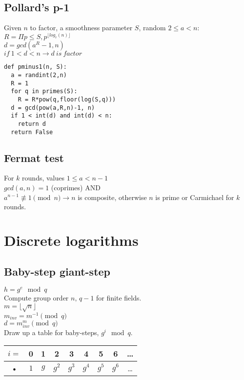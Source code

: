 \documentclass{article}
\begin{document}
\subsection{Pollard's p-1}
Given $n$ to factor, a smoothness parameter $S$, random $2 \leq a < n$: \\
$R = \Pi p \leq S, p^{\lfloor log_r(n) \rfloor}$ \\
$d = gcd(a^R-1, n)$ \\
$if~1 < d < n \rightarrow d~is~factor$ \\

\begin{verbatim}
def pminus1(n, S):
  a = randint(2,n)
  R = 1
  for q in primes(S):
    R = R*pow(q,floor(log(S,q)))
  d = gcd(pow(a,R,n)-1, n)
  if 1 < int(d) and int(d) < n:
    return d
  return False
\end{verbatim}

\subsection{Fermat test}
For $k$ rounds, values $1 \leq a < n-1$ \\
$gcd(a,n) = 1$ (coprimes) AND \\
$a^{n-1} \not\equiv 1 \pmod n \rightarrow n$ is composite,
otherwise $n$ is prime or Carmichael for $k$ rounds. \\

\section{Discrete logarithms}
\subsection{Baby-step giant-step}
$h = g^e \mod q$ \\
Compute group order $n$, $q-1$ for finite fields. \\
$m = \lfloor \sqrt{n} \rfloor$\\
$m_{inv} = m^{-1} \pmod{q}$\\
$d = m_{inv}^{m} \pmod{q}$\\

Draw up a table for baby-steps, $g^i \mod q$.\\
\begin{tabular}{|c|c|c|c|c|c|c|c|c|}
\hline
$i = $ & 0 & 1 & 2 & 3 & 4 & 5 & 6 & \ldots \\
\hline
• & $1$ & $g$ & $g^2$ & $g^3$ & $g^4$ & $g^5$ & $g^6$ & \ldots \\
\hline
\end{tabular}
\end{document}
